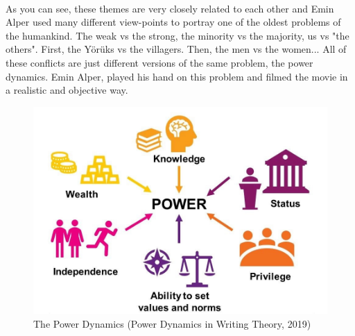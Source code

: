 \documentclass[12pt]{article}
\begin{document}
\\
As you can see, these themes are very closely related to each other and Emin Alper used many different view-points to portray one of the oldest problems of the humankind. The weak vs the strong, the minority vs the majority, us vs "the others". First, the Yörüks vs the villagers. Then, the men vs the women... All of these conflicts are just different versions of the same problem, the power dynamics. Emin Alper, played his hand on this problem and filmed the movie in a realistic and objective way.

\begin{figure}[h]
        \begin{center}
                \includegraphics[width=120mm,scale=0.5]{power}
                \caption{The Power Dynamics (Power Dynamics in Writing Theory, 2019)}
        \end{center}
\end{figure}

\FloatBarrier
\end{document}
